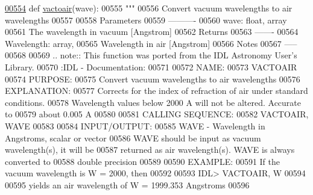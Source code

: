 \begin{DoxyCode}
\hypertarget{namespacepyneb_1_1utils_1_1physics_l00554}{}\hyperlink{namespacepyneb_1_1utils_1_1physics_aafb02f69e32ab62fa89420481f9a65f4}{00554} \textcolor{keyword}{def }\hyperlink{namespacepyneb_1_1utils_1_1physics_aafb02f69e32ab62fa89420481f9a65f4}{vactoair}(wave):
00555     \textcolor{stringliteral}{"""}
00556 \textcolor{stringliteral}{Convert vacuum wavelengths to air wavelengths}
00557 \textcolor{stringliteral}{}
00558 \textcolor{stringliteral}{Parameters}
00559 \textcolor{stringliteral}{----------}
00560 \textcolor{stringliteral}{wave: float, array}
00561 \textcolor{stringliteral}{The wavelength in vacuum [Angstrom]}
00562 \textcolor{stringliteral}{Returns}
00563 \textcolor{stringliteral}{-------}
00564 \textcolor{stringliteral}{Wavelength: array,}
00565 \textcolor{stringliteral}{Wavelength in air [Angstrom]}
00566 \textcolor{stringliteral}{Notes}
00567 \textcolor{stringliteral}{-----}
00568 \textcolor{stringliteral}{}
00569 \textcolor{stringliteral}{.. note:: This function was ported from the IDL Astronomy User's Library.}
00570 \textcolor{stringliteral}{:IDL - Documentation:}
00571 \textcolor{stringliteral}{}
00572 \textcolor{stringliteral}{NAME:}
00573 \textcolor{stringliteral}{VACTOAIR}
00574 \textcolor{stringliteral}{PURPOSE:}
00575 \textcolor{stringliteral}{Convert vacuum wavelengths to air wavelengths}
00576 \textcolor{stringliteral}{EXPLANATION:}
00577 \textcolor{stringliteral}{Corrects for the index of refraction of air under standard conditions.}
00578 \textcolor{stringliteral}{Wavelength values below 2000 A will not be altered. Accurate to}
00579 \textcolor{stringliteral}{about 0.005 A}
00580 \textcolor{stringliteral}{}
00581 \textcolor{stringliteral}{CALLING SEQUENCE:}
00582 \textcolor{stringliteral}{VACTOAIR, WAVE}
00583 \textcolor{stringliteral}{}
00584 \textcolor{stringliteral}{INPUT/OUTPUT:}
00585 \textcolor{stringliteral}{WAVE - Wavelength in Angstroms, scalar or vector}
00586 \textcolor{stringliteral}{WAVE should be input as vacuum wavelength(s), it will be}
00587 \textcolor{stringliteral}{returned as air wavelength(s). WAVE is always converted to}
00588 \textcolor{stringliteral}{double precision}
00589 \textcolor{stringliteral}{}
00590 \textcolor{stringliteral}{EXAMPLE:}
00591 \textcolor{stringliteral}{If the vacuum wavelength is W = 2000, then}
00592 \textcolor{stringliteral}{}
00593 \textcolor{stringliteral}{IDL> VACTOAIR, W}
00594 \textcolor{stringliteral}{}
00595 \textcolor{stringliteral}{yields an air wavelength of W = 1999.353 Angstroms}
00596 \textcolor{stringliteral}{}

\end{DoxyCode}
